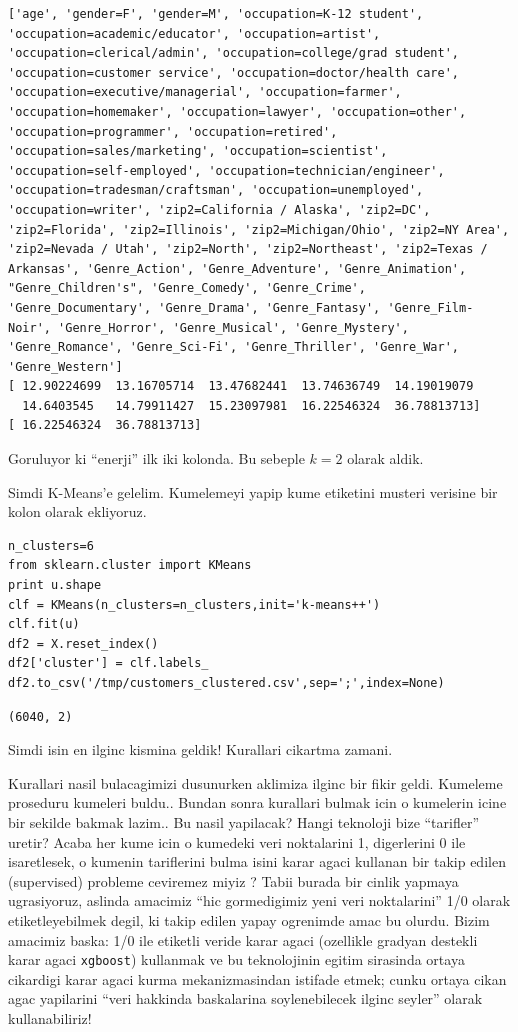 \documentclass[12pt,fleqn]{article}\usepackage{../common}
\begin{document}
\begin{verbatim}
['age', 'gender=F', 'gender=M', 'occupation=K-12 student', 'occupation=academic/educator', 'occupation=artist', 'occupation=clerical/admin', 'occupation=college/grad student', 'occupation=customer service', 'occupation=doctor/health care', 'occupation=executive/managerial', 'occupation=farmer', 'occupation=homemaker', 'occupation=lawyer', 'occupation=other', 'occupation=programmer', 'occupation=retired', 'occupation=sales/marketing', 'occupation=scientist', 'occupation=self-employed', 'occupation=technician/engineer', 'occupation=tradesman/craftsman', 'occupation=unemployed', 'occupation=writer', 'zip2=California / Alaska', 'zip2=DC', 'zip2=Florida', 'zip2=Illinois', 'zip2=Michigan/Ohio', 'zip2=NY Area', 'zip2=Nevada / Utah', 'zip2=North', 'zip2=Northeast', 'zip2=Texas / Arkansas', 'Genre_Action', 'Genre_Adventure', 'Genre_Animation', "Genre_Children's", 'Genre_Comedy', 'Genre_Crime', 'Genre_Documentary', 'Genre_Drama', 'Genre_Fantasy', 'Genre_Film-Noir', 'Genre_Horror', 'Genre_Musical', 'Genre_Mystery', 'Genre_Romance', 'Genre_Sci-Fi', 'Genre_Thriller', 'Genre_War', 'Genre_Western']
[ 12.90224699  13.16705714  13.47682441  13.74636749  14.19019079
  14.6403545   14.79911427  15.23097981  16.22546324  36.78813713]
[ 16.22546324  36.78813713]
\end{verbatim}

Goruluyor ki ``enerji'' ilk iki kolonda. Bu sebeple $k=2$ olarak aldik.

Simdi K-Means'e gelelim. Kumelemeyi yapip kume etiketini musteri verisine
bir kolon olarak ekliyoruz. 

\begin{verbatim}
n_clusters=6
from sklearn.cluster import KMeans
print u.shape
clf = KMeans(n_clusters=n_clusters,init='k-means++')
clf.fit(u)    
df2 = X.reset_index()
df2['cluster'] = clf.labels_
df2.to_csv('/tmp/customers_clustered.csv',sep=';',index=None)
\end{verbatim}

\begin{verbatim}
(6040, 2)
\end{verbatim}

Simdi isin en ilginc kismina geldik! Kurallari cikartma zamani.

Kurallari nasil bulacagimizi dusunurken aklimiza ilginc bir fikir
geldi. Kumeleme proseduru kumeleri buldu.. Bundan sonra kurallari bulmak
icin o kumelerin icine bir sekilde bakmak lazim.. Bu nasil yapilacak?
Hangi teknoloji bize ``tarifler'' uretir? Acaba her kume icin o kumedeki
veri noktalarini 1, digerlerini 0 ile isaretlesek, o kumenin tariflerini
bulma isini karar agaci kullanan bir takip edilen (supervised) probleme
ceviremez miyiz ? Tabii burada bir cinlik yapmaya ugrasiyoruz, aslinda
amacimiz ``hic gormedigimiz yeni veri noktalarini'' 1/0 olarak
etiketleyebilmek degil, ki takip edilen yapay ogrenimde amac bu
olurdu. Bizim amacimiz baska: 1/0 ile etiketli veride karar agaci
(ozellikle gradyan destekli karar agaci \verb!xgboost!) kullanmak ve bu
teknolojinin egitim sirasinda ortaya cikardigi karar agaci kurma
mekanizmasindan istifade etmek; cunku ortaya cikan agac yapilarini ``veri
hakkinda baskalarina soylenebilecek ilginc seyler'' olarak kullanabiliriz!
\end{document}
